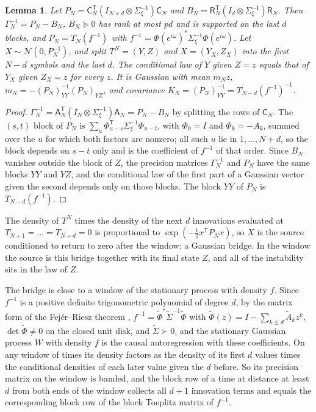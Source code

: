 \documentclass[11pt,onecolumn]{IEEEtran}
\newtheorem{lemma}[theorem]{Lemma}
\begin{document}
\begin{lemma}\label{lem:bridge}
Let $P_N=\mathsf C_N^{\mathsf T}(I_{N+d}\otimes\Sigma_\xi^{-1})\mathsf C_N$
and $B_N=\mathsf R_N^{\mathsf T}(I_d\otimes\Sigma_\xi^{-1})\mathsf R_N$.
Then $\Gamma_N^{-1}=P_N-B_N$, $B_N\succeq0$ has rank at most $pd$ and
is supported on the last $d$ blocks, and $P_N=T_N(f^{-1})$ with
$f^{-1}=\Phi(e^{i\omega})^*\Sigma_\xi^{-1}\Phi(e^{i\omega})$.
Let $X\sim\mathcal N(0,P_N^{-1})$, and split $T^N=(Y,Z)$ and $X=(Y_X,Z_X)$
into the first $N-d$ symbols and the last $d$. The conditional law of
$Y$ given $Z=z$ equals that of $Y_X$ given $Z_X=z$ for every $z$. It is
Gaussian with mean $m_Nz$, $m_N=-(P_N)_{YY}^{-1}(P_N)_{YZ}$, and
covariance $K_N=(P_N)_{YY}^{-1}=T_{N-d}(f^{-1})^{-1}$.
\end{lemma}

\begin{proof}
$\Gamma_N^{-1}=\mathsf A_N^{\mathsf T}(I_N\otimes\Sigma_\xi^{-1})\mathsf A_N=P_N-B_N$
by splitting the rows of $\mathsf C_N$. The $(s,t)$ block of $P_N$ is
$\sum_u\Phi_{u-s}^{\mathsf T}\Sigma_\xi^{-1}\Phi_{u-t}$, with
$\Phi_0=I$ and $\Phi_k=-A_k$, summed over the $u$ for which both factors
are nonzero; all such $u$ lie in $1,\dots,N+d$, so the block depends on
$s-t$ only and is the coefficient of $f^{-1}$ of that order.
Since $B_N$ vanishes outside the block of $Z$, the precision matrices
$\Gamma_N^{-1}$ and $P_N$ have the same blocks $YY$ and $YZ$, and the
conditional law of the first part of a Gaussian vector given the second
depends only on those blocks. The block $YY$ of $P_N$ is
$T_{N-d}(f^{-1})$.
\end{proof}

The density of $T^N$ times the density of the next $d$ innovations
evaluated at $T_{N+1}=\dots=T_{N+d}=0$ is proportional to
$\exp(-\tfrac12x^{\mathsf T}P_Nx)$, so $X$ is the source conditioned to
return to zero after the window: a Gaussian bridge. In the window the
source is this bridge together with its final state $Z$, and all of the
instability sits in the law of $Z$.

The bridge is close to a window of the stationary process with density
$f$. Since $f^{-1}$ is a positive definite trigonometric polynomial of
degree $d$, by the matrix form of the Fej\'er--Riesz theorem
\cite{rosenblum1985}, $f^{-1}=\tilde\Phi^*\tilde\Sigma^{-1}\tilde\Phi$ with
$\tilde\Phi(z)=I-\sum_{k\le d}\tilde A_kz^k$, $\det\tilde\Phi\ne0$ on the
closed unit disk, and $\tilde\Sigma\succ0$, and the stationary Gaussian
process $W$ with density $f$ is the causal autoregression with these
coefficients. On any window of times its density factors as the
density of its first $d$ values times the conditional densities of each
later value given the $d$ before. So its precision matrix on the window
is banded, and the block row of a time at distance at least $d$ from
both ends of the window collects all $d+1$ innovation terms and equals
the corresponding block row of the block Toeplitz matrix of $f^{-1}$.
\end{document}
